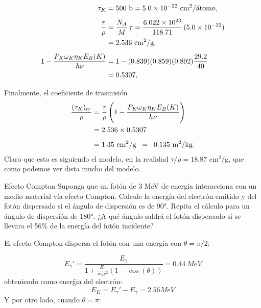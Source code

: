 \begin{align} \small
    \tau_K &= 500\ \text{b} = 5.0\times 10^{-22}\ \text{cm}^2/\text{átomo}, \\[1ex]
    \frac{\tau}{\rho} &= \frac{N_A}{M}\,\tau 
    = \frac{6.022\times 10^{23}}{118.71}\,(5.0\times 10^{-22}) \notag \\
    &= 2.536\ \text{cm}^2/\text{g}, \\[1ex]
    1 - \frac{P_K \omega_K \eta_K E_B(K)}{h\nu} 
    &= 1 - (0.839)(0.859)(0.892)\frac{29.2}{40} \notag \\
    &= 0.5307, \\[1ex]
\end{align}
Finalmente, el coeficiente de trasmisión 
\begin{align}
    \frac{(\tau_K)_{tr}}{\rho} 
    &= \frac{\tau}{\rho}\,\Biggl(1 - \frac{P_K \omega_K \eta_K E_B(K)}{h\nu}\Biggr) \notag \\
    &= 2.536 \times 0.5307 \\[1ex]
    &= 1.35\ \text{cm}^2/\text{g} \;\;=\;\; 0.135\ \text{m}^2/\text{kg}.
\end{align}
Claro que esto es siguiendo el modelo, en la realidad $\tau/\rho=18.87$ cm$^2$/g, que como podemos ver dista mucho del modelo. 




\begin{Ejercicio}{Efecto Compton}
    Suponga que un fotón de 3 MeV de energía interacciona con un medio material vía efecto Compton. Calcule la energía del electrón emitido y del fotón dispersado si el ángulo de dispersión es de 90°. Repita el cálculo para un ángulo de dispersión de 180°. ¿A qué ángulo saldrá el fotón dispersado si se llevara el 56\% de la energía del fotón incidente?
\end{Ejercicio}

El efecto Compton dispersa el fotón con una energía con $\theta=\pi/2$:

\begin{equation*}
    E_{\gamma}' = \frac{E_{\gamma}}{1+\frac{E_{\gamma}}{m_ec^2} (1-\cos(\theta))} = 0.44 \ \unit{MeV}
\end{equation*}
obteniendo como enerǵia del electrón: 
\begin{equation*}
    E_K = E_{\gamma}'-E_{\gamma} =  2.56 \unit{MeV}
\end{equation*}
Y por otro lado, cuando $\theta=\pi$:

